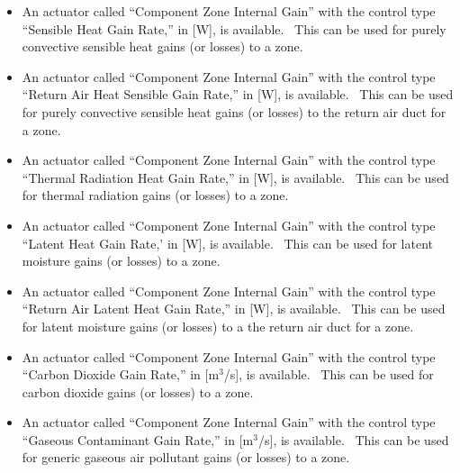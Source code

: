 \begin{itemize}
\item
  An actuator called ``Component Zone Internal Gain'' with the control type ``Sensible Heat Gain Rate,'' in {[}W{]}, is available.~ This can be used for purely convective sensible heat gains (or losses) to a zone.
\item
  An actuator called ``Component Zone Internal Gain'' with the control type ``Return Air Heat Sensible Gain Rate,'' in {[}W{]}, is available.~ This can be used for purely convective sensible heat gains (or losses) to the return air duct for a zone.
\item
  An actuator called ``Component Zone Internal Gain'' with the control type ``Thermal Radiation Heat Gain Rate,'' in {[}W{]}, is available.~ This can be used for thermal radiation gains (or losses) to a zone.
\item
  An actuator called ``Component Zone Internal Gain'' with the control type ``Latent Heat Gain Rate,' in {[}W{]}, is available.~ This can be used for latent moisture gains (or losses) to a zone.
\item
  An actuator called ``Component Zone Internal Gain'' with the control type ``Return Air Latent Heat Gain Rate,'' in {[}W{]}, is available.~ This can be used for latent moisture gains (or losses) to a the return air duct for a zone.
\item
  An actuator called ``Component Zone Internal Gain'' with the control type ``Carbon Dioxide Gain Rate,'' in {[}m\(^{3}\)/s{]}, is available.~ This can be used for carbon dioxide gains (or losses) to a zone.
\item
  An actuator called ``Component Zone Internal Gain'' with the control type ``Gaseous Contaminant Gain Rate,'' in {[}m\(^{3}\)/s{]}, is available.~ This can be used for generic gaseous air pollutant gains (or losses) to a zone.
\end{itemize}
